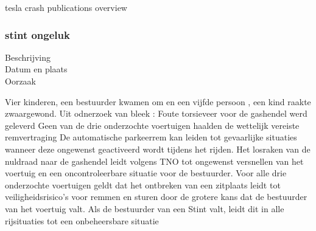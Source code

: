 \cite{globaltimes08052021guangdongcrash}

\cite{anderson30042021secondteslacrash}

\cite{oremus21062017fatalTeslaCrash}

\cite{guardian15052021teslacrashHandsOnWheel}

\cite{Puzzanghera13092017TeslaSharesBlame}

\cite{jaillet02022017teslaAutopilotLimitations}

\cite{reuters03102019teslaAutoParkingFail}

\cite{dowling23042021}

\cite{young05112021fatalTeslaReport}

\cite{kierstein18032021teslaAutopilotCrashStationary}

\cite{janssen20062017teslacrashdetailflorida}

 





tesla crash publications overview





 

\subsubsection{stint ongeluk}

	\begin{description}
	\item[Beschrijving]
	\item[Datum en plaats] 
	\item[Oorzaak]
\end{description}
Vier kinderen, een bestuurder kwamen om en een vijfde persoon , een kind raakte zwaargewond. Uit odnerzoek van bleek :
Foute torsieveer voor de gashendel werd geleverd
Geen van de drie onderzochte voertuigen haalden de wettelijk vereiste remvertraging
De automatische parkeerrem kan leiden tot gevaarlijke situaties wanneer deze ongewenst geactiveerd wordt tijdens het rijden. 
Het losraken van de nuldraad naar de gashendel leidt volgens TNO tot ongewenst versnellen van het voertuig en een oncontroleerbare situatie voor de bestuurder.
Voor alle drie onderzochte voertuigen geldt dat het ontbreken van een zitplaats leidt tot veiligheidsrisico’s voor remmen en sturen door de grotere kans dat de bestuurder van het voertuig valt. Als de bestuurder van een Stint valt, leidt dit in alle rijsituaties tot een onbeheersbare situatie


